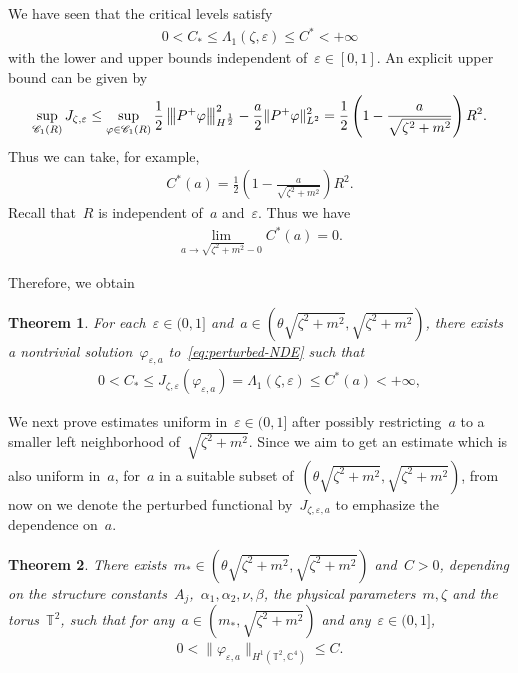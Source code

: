 \documentclass[11pt,final]{amsart}
\newcommand{\tnorm}[1]{%
  \left\vert\kern-0.3ex\left\vert\kern-0.3ex\left\vert #1 \right\vert\kern-0.3ex\right\vert\kern-0.3ex\right\vert
}
\newcommand{\C}{\mathbb{C}}
\newcommand{\T}{\mathbb{T}}
\newcommand{\eps}{\varepsilon}
\newcommand{\parenthesis}[1]{\left(#1\right)} %
\newtheorem{thm}{Theorem}[section]
\begin{document}
We have seen that the critical levels satisfy
\begin{align}
    0<C_*\leq \Lambda_1(\zeta,\eps) \leq C^*<+\infty
\end{align}
with the lower and upper bounds independent of~$\eps\in [0,1]$. 
An explicit upper bound can be given by 
\begin{align}
    \sup_{\mathscr{C}_1(R)} J_{\zeta,\eps} 
    \leq \sup_{ \varphi\in \mathscr{C}_1(R)} \frac{1}{2}\tnorm{P^+\varphi}_{H^{\frac{1}{2}}}^2 - \frac{a}{2}\|P^+\varphi\|_{L^2}^2 = \frac{1}{2}\parenthesis{1-\frac{a}{\sqrt{\zeta^2+m^2}}}R^2. 
\end{align}
Thus we can take, for example,
\begin{align}
    C^*(a)= \frac{1}{2}\parenthesis{1-\frac{a}{\sqrt{\zeta^2+m^2}}}R^2. 
\end{align}
Recall that~$R$ is independent of~$a$ and~$\eps$.
Thus we have 
\begin{align}\label{eq:upper-level-estimate}
    \lim_{a\to \sqrt{\zeta^2+m^2}-0} C^*(a)=0.
\end{align}

Therefore, we obtain
\begin{thm}\label{thm:existence for perturbed NDE}
    For each~$\eps\in (0,1]$ and~$a\in (\theta\sqrt{\zeta^2+m^2},\sqrt{\zeta^2+m^2})$, there exists a nontrivial solution~$\varphi_{\eps,a}$ to~\eqref{eq:perturbed-NDE} such that
    \begin{align}
        0<C_* \leq J_{\zeta,\eps}(\varphi_{\eps,a})=\Lambda_1(\zeta,\eps)\leq C^*(a)<+\infty,
    \end{align}
\end{thm}

We next prove estimates uniform in~$\eps\in (0,1]$ after possibly restricting~$a$ to a smaller left neighborhood of~$\sqrt{\zeta^2+m^2}$. 
Since we aim to get an estimate which is also uniform in~$a$, for~$a$ in a suitable subset of~$(\theta\sqrt{\zeta^2+m^2},\sqrt{\zeta^2+m^2})$, from now on we denote the perturbed functional by~$J_{\zeta,\eps,a}$ to emphasize the dependence on~$a$. 

\begin{thm}\label{thm:uniform estimate}
    There exists~$m_*\in (\theta\sqrt{\zeta^2+m^2},\sqrt{\zeta^2+m^2})$ and~$C>0$, depending on the structure constants~$A_j$,~$\alpha_1,\alpha_2,\nu,\beta$, the physical parameters~$m,\zeta$ and the torus~$\T^2$, such that for any~$a\in (m_*, \sqrt{\zeta^2+m^2})$ and any~$\eps\in (0,1]$, 
    \begin{align}\label{eq:uniform estimate}
         0<\|\varphi_{\eps,a}\|_{H^1(\T^2,\C^4)}\leq C. 
    \end{align}
\end{thm}
\end{document}
